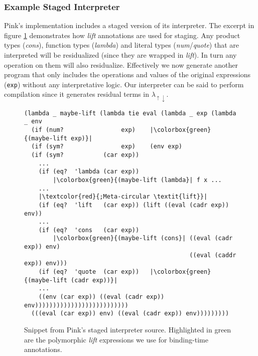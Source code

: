 \documentclass[a4paper,12pt,twoside,openright]{report}
\theoremstyle{definition}
\newcommand{\mslang}{$\lambda_{\uparrow\downarrow}$}
\begin{document}
\subsubsection{Example Staged Interpreter}
Pink's implementation includes a staged version of its interpreter. The excerpt in figure \ref{fig:pink_source} demonstrates how \textit{lift} annotations are used for staging. Any product types (\textit{cons}), function types (\textit{lambda}) and literal types (\textit{num}/\textit{quote}) that are interpreted will be residualized (since they are wrapped in \textit{lift}). In turn any operation on them will also residualize. Effectively we now generate another program that only includes the operations and values of the original expressions (\texttt{exp}) without any interpretative logic. Our interpreter can be said to perform compilation since it generates residual terms in \mslang.

\begin{figure}[ht!]
\begin{verbatim}
(lambda _ maybe-lift (lambda tie eval (lambda _ exp (lambda _ env
  (if (num?                exp)    |\colorbox{green}{(maybe-lift exp)}|
  (if (sym?                exp)    (env exp)
  (if (sym?           (car exp))
    ...
    (if (eq?  'lambda (car exp))
        |\colorbox{green}{(maybe-lift (lambda}| f x ...
    ...
    |\textcolor{red}{;Meta-circular \textit{lift}}|
    (if (eq?  'lift   (car exp)) (lift ((eval (cadr exp)) env))
    ...
    (if (eq?  'cons   (car exp))
        |\colorbox{green}{(maybe-lift (cons}| ((eval (cadr exp)) env)
                                              ((eval (caddr exp)) env)))
    (if (eq?  'quote  (car exp))   |\colorbox{green}{(maybe-lift (cadr exp))}|
    ...
    ((env (car exp)) ((eval (cadr exp)) env))))))))))))))))))))))))))
  (((eval (car exp)) env) ((eval (cadr exp)) env)))))))))
\end{verbatim}
\caption{Snippet from Pink's staged interpreter source. Highlighted in green are the polymorphic \textit{lift} expressions we use for binding-time annotations.}
\label{fig:pink_source}
\end{figure}
\end{document}
